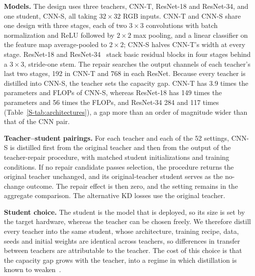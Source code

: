 \documentclass[10pt,journal,compsoc]{IEEEtran}
\theoremstyle{definition}
\begin{document}
\textbf{Models.} The design uses three teachers, CNN-T, ResNet-18 and
ResNet-34, and one student, CNN-S, all taking $32\times32$ RGB inputs.
CNN-T and CNN-S share one design with three stages, each of two
$3\times3$ convolutions with batch normalization and ReLU followed by
$2\times2$ max pooling, and a linear classifier on the feature map
average-pooled to $2\times2$; CNN-S halves CNN-T's width at every stage.
ResNet-18 and ResNet-34~\cite{he2016deep} stack basic residual blocks in
four stages behind a $3\times3$, stride-one stem. The repair searches the
output channels of each teacher's last two stages, 192 in CNN-T and 768
in each ResNet. Because every teacher is distilled into CNN-S, the
teacher sets the capacity gap. CNN-T has 3.9 times the parameters and
FLOPs of CNN-S, whereas ResNet-18 has 149 times the parameters and 56
times the FLOPs, and ResNet-34 284 and 117 times
(Table~\ref{S-tab:architectures}), a gap more than an order of magnitude
wider than that of the CNN pair.

\textbf{Teacher--student pairings.} For each teacher and each of the 52
settings, CNN-S is distilled first from the original teacher and then
from the output of the teacher-repair procedure, with matched student
initializations and training conditions. If no repair candidate passes
selection, the procedure returns the original teacher unchanged, and its
original-teacher student serves as the no-change outcome. The repair
effect is then zero, and the setting remains in the aggregate
comparison. The alternative KD losses use the original teacher.

\textbf{Student choice.} The student is the model that is deployed, so
its size is set by the target hardware, whereas the teacher can be
chosen freely. We therefore distill every teacher into the same student,
whose architecture, training recipe, data, seeds and initial weights are
identical across teachers, so differences in transfer between teachers
are attributable to the teacher. The cost of this choice is that the
capacity gap grows with the teacher, into a regime in which distillation
is known to weaken~\cite{cho2019efficacy}.
\end{document}
